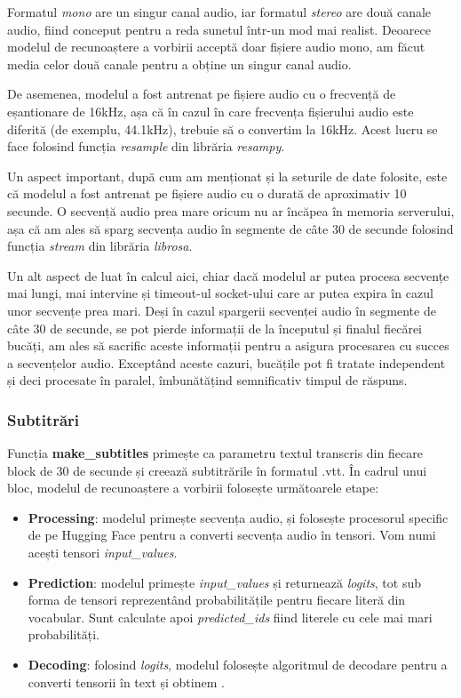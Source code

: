 \par
Formatul \textit{mono} are un singur canal audio, iar formatul \textit{stereo} are două canale audio, 
fiind conceput pentru a reda sunetul într-un mod mai realist. Deoarece modelul de recunoaștere a vorbirii
acceptă doar fișiere audio mono, am făcut media celor două canale pentru a obține un singur canal audio.

\par
De asemenea, modelul a fost antrenat pe fișiere audio cu o frecvență de eșantionare de 16kHz, așa că
în cazul în care frecvența fișierului audio este diferită (de exemplu, 44.1kHz), trebuie să o convertim
la 16kHz. Acest lucru se face folosind funcția \textit{resample} din librăria \textit{resampy}.

\par
Un aspect important, după cum am menționat și la seturile de date folosite, este că modelul a fost
antrenat pe fișiere audio cu o durată de aproximativ 10 secunde. O secvență audio prea mare oricum
nu ar încăpea în memoria serverului, așa că am ales să sparg secvența audio în segmente de câte 30 de
secunde folosind funcția \textit{stream} din librăria \textit{librosa}.

\par
Un alt aspect de luat în calcul aici, chiar dacă modelul ar putea procesa secvențe mai lungi, mai
intervine și timeout-ul socket-ului care ar putea expira în cazul unor secvențe prea mari. Deși în
cazul spargerii secvenței audio în segmente de câte 30 de secunde, se pot pierde informații de 
la începutul și finalul fiecărei bucăți, am ales să sacrific aceste informații pentru a asigura
procesarea cu succes a secvențelor audio. Exceptând aceste cazuri, bucățile pot fi tratate independent
și deci procesate în paralel, îmbunătățind semnificativ timpul de răspuns.

\subsubsection{Subtitrări}
\label{subsec:subtitles}
\par
Funcția \textbf{make\_subtitles} primește ca parametru textul transcris din fiecare block de 30 de secunde
și creează subtitrările în formatul .vtt. În cadrul unui bloc, modelul de recunoaștere a vorbirii 
folosește următoarele etape:
\begin{itemize}
    \item \textbf{Processing}: modelul primește secvența audio, și folosește procesorul specific de pe
    Hugging Face pentru a converti secvența audio în tensori. Vom numi acești tensori \textit{input\_values}.
    \item \textbf{Prediction}: modelul primește \textit{input\_values} și returnează \textit{logits}, tot
    sub forma de tensori reprezentând probabilitățile pentru fiecare literă din vocabular. Sunt calculate
    apoi \textit{predicted\_ids} fiind literele cu cele mai mari probabilități.
    \item \textbf{Decoding}: folosind \textit{logits}, modelul folosește algoritmul de decodare pentru a
    converti tensorii în text și obtinem .
\end{itemize}

